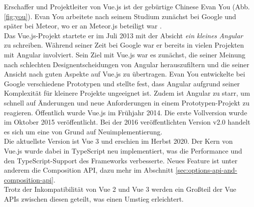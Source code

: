 Erschaffer und Projektleiter von Vue.js ist der gebürtige Chinese Evan You (Abb. \ref{fig:you}).
Evan You arbeitete nach seinem Studium zunächst bei Google und später bei Meteor, wo er
an Meteor.js beteiligt war \cite{linkedinYou}.
\\
Das Vue.js-Projekt startete er im Juli 2013 mit der Absicht \emph{ein kleines Angular}
zu schreiben.
Während seiner Zeit bei Google war er bereits in vielen Projekten mit Angular involviert.
Sein Ziel mit Vue.js war es zunächst, die seiner Meinung nach schlechten Designentscheidungen von Angular herauszufiltern
und die seiner Ansicht nach guten Aspekte auf Vue.js zu übertragen.
Evan You entwickelte bei Google verschiedene Prototypen und stellte fest,
dass Angular aufgrund seiner Komplexität für kleinere Projekte ungeeignet ist.
Zudem ist Angular zu starr, um schnell auf Änderungen und neue Anforderungen in einem Prototypen-Projekt zu reagieren.
Öffentlich wurde Vue.js im Frühjahr 2014.
Die erste Vollversion wurde im Oktober 2015 veröffentlicht.
Bei der 2016 veröffentlichten Version v2.0 handelt es sich um eine von Grund auf Neuimplementierung. \cite[1:11-4:42]{vueNYC}
\\
Die aktuellste Version ist Vue 3 und erschien im Herbst 2020.
Der Kern von Vue.js wurde dabei in TypeScript neu implementiert, was die Performance und den TypeScript-Support des Frameworks verbesserte.
Neues Feature ist unter anderem die Composition API, dazu mehr im Abschnitt \ref{sec:options-api-and-composition-api}. \cite{konstantinidis2020}
\\
Trotz der Inkompatibilität von Vue 2 und Vue 3 werden ein Großteil der Vue APIs zwischen diesen geteilt,
was einen Umstieg erleichtert. \cite{vueFAQ}

